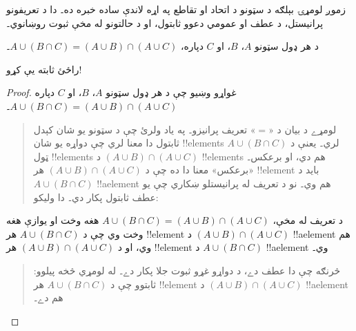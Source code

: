 \documentclass[../../../include/open-logic-section]{subfiles}
\begin{document}


زموږ لومړۍ بېلګه د سټونو د اتحاد او تقاطع
په اړه لاندې ساده خبره ده۔ دا د تعريفونو
پرانيستل، د عطف او عمومي دعوو ثابتول،
او د حالتونو له مخې ثبوت روښانوي۔

\begin{prop}
د هر ډول سټونو $A$، $B$، او $C$ دپاره،
$A \cup (B \cap C) = (A \cup B)
\cap (A \cup C)$۔
\end{prop}

راځئ ثابته يې کړو!{}

\begin{proof}
غواړو وښيو چې د هر ډول سټونو $A$، $B$، او
$C$ دپاره $A \cup (B \cap
C) = (A \cup B) \cap (A \cup C)$۔
\begin{quote}
لومړے د بيان د «$=$» تعريف پرانيزو۔
په ياد ولرئ چې د سټونو يو شان کېدل
ثابتول دا معنا لري چې دواړه يو شان
!!{element}s لري۔ يعنې د $A \cup
(B \cap C)$ ټول !!{element}s
د $(A \cup B) \cap (A \cup C)$
!!{element}s هم دي، او برعکس۔
«برعکس» معنا دا ده چې د $(A
\cup B) \cap (A \cup C)$ هر
!!{element} بايد د $A \cup (B \cap
C)$ !!a{element} هم وي۔
نو د تعريف له پرانيستلو ښکاري
چې يو عطف ثابتول پکار دي۔
دا وليکو:
\end{quote}
د تعريف له مخې،
$A \cup (B \cap C) = (A \cup B) \cap (A \cup C)$
هغه وخت او يوازې هغه وخت وي چې د
$A \cup (B \cap C)$ هر !!{element}
د $(A
\cup B) \cap (A \cup C)$
!!a{element} هم وي، او د
$(A \cup B) \cap (A
\cup C)$ هر !!{element} د
$A \cup (B \cap C)$
!!a{element} وي۔
\begin{quote}
څرنګه چې دا عطف دے، د دواړو غړو
ثبوت جلا پکار دے۔ له لومړي څخه
پيلوو: ثابتوو چې د
$A \cup (B \cap C)$ هر
!!{element} د $(A
\cup B) \cap (A \cup C)$
!!a{element} هم دے۔


\end{quote}
\end{proof}
\end{document}
